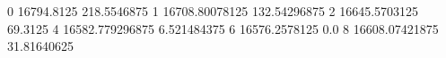 0 16794.8125 218.5546875
1 16708.80078125 132.54296875
2 16645.5703125 69.3125
4 16582.779296875 6.521484375
6 16576.2578125 0.0
8 16608.07421875 31.81640625
